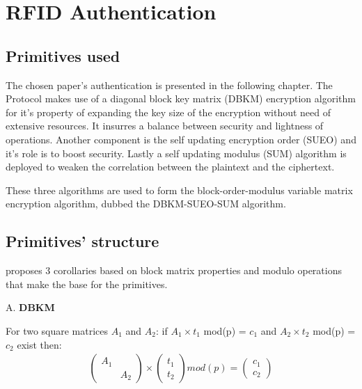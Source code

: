 \chapter{RFID Authentication}

\section{Primitives used}
    The chosen paper\cite{BOM}'s authentication is presented in the following chapter. The Protocol makes use of a diagonal block key matrix (DBKM) encryption algorithm for it's property of 
    expanding the key size of the encryption without need of extensive resources. It insurres a balance between security and lightness of operations. Another component is the self updating encryption 
    order (SUEO) and it's role is to boost security. Lastly a self updating modulus (SUM) algorithm is deployed to weaken the correlation between the plaintext and the ciphertext.
    
    These three algorithms are used to form the block-order-modulus variable matrix encryption algorithm, dubbed the DBKM-SUEO-SUM algorithm.

\section{Primitives' structure}

    \cite{BOM} proposes 3 corollaries based on block matrix properties and modulo operations that make the base for the primitives.

    A. \textbf{DBKM}

    For two square matrices $A_1$ and $A_2$: if $A_1 \times t_1$ mod(p) = $c_1$ and $A_2 \times t_2$ mod(p) = $c_2$ exist then:
    \begin{gather*}
        \begin{pmatrix}
        A_1 &  \\
            & A_2
        \end{pmatrix}
        \times
        \begin{pmatrix}
            t_1  \\
            t_2
        \end{pmatrix}
        mod(p)
        =
        \begin{pmatrix}
            c_1  \\
            c_2
        \end{pmatrix}
    \end{gather*}

